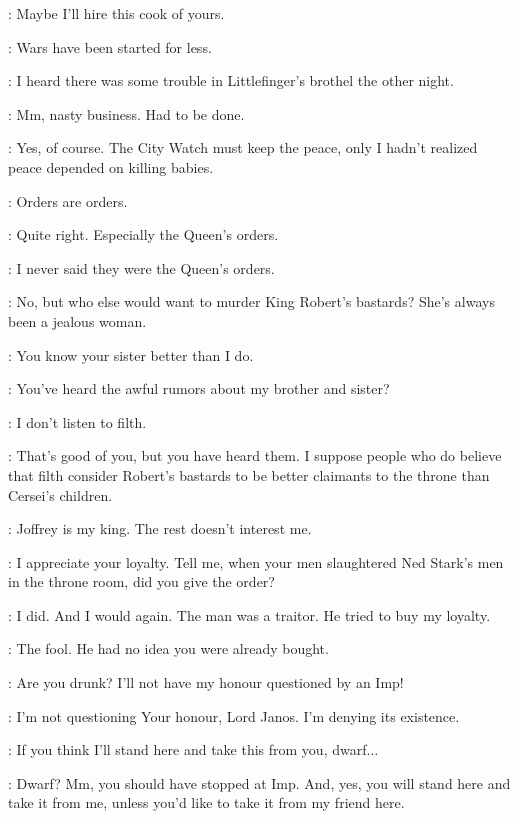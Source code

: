 \JANOSSLYNT: Maybe I'll hire this cook of yours.

\TYRION: Wars have been started for less.


\TYRION: I heard there was some trouble in Littlefinger's brothel the other night.

\JANOSSLYNT: Mm, nasty business. Had to be done.

\TYRION: Yes, of course. The City Watch must keep the peace, only I hadn't realized peace depended on killing babies.

\JANOSSLYNT: Orders are orders.

\TYRION: Quite right. Especially the Queen's orders.

\JANOSSLYNT: I never said they were the Queen's orders.

\TYRION: No, but who else would want to murder King Robert's bastards? She's always been a jealous woman.

\JANOSSLYNT: You know your sister better than I do.

\TYRION: You've heard the awful rumors about my brother and sister?

\JANOSSLYNT: I don't listen to filth.

\TYRION: That's good of you, but you have heard them. I suppose people who do believe that filth consider Robert's bastards to be better claimants to the throne than Cersei's children.

\JANOSSLYNT: Joffrey is my king. The rest doesn't interest me.

\TYRION: I appreciate your loyalty. Tell me, when your men slaughtered Ned Stark's men in the throne room, did you give the order?

\JANOSSLYNT: I did. And I would again. The man was a traitor. He tried to buy my loyalty.

\TYRION: The fool. He had no idea you were already bought.

\JANOSSLYNT: Are you drunk? I'll not have my honour questioned by an Imp!

\TYRION: I'm not questioning Your honour, Lord Janos. I'm denying its existence.

\JANOSSLYNT: If you think I'll stand here and take this from you, dwarf$\ldots$

\TYRION: Dwarf? Mm, you should have stopped at Imp. And, yes, you will stand here and take it from me, unless you'd like to take it from my friend here.

